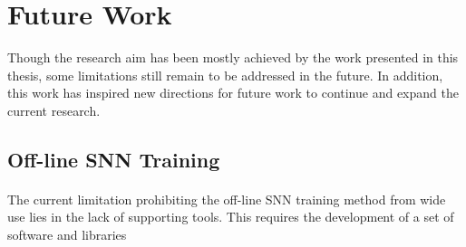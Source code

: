 %



\section{Future Work}
Though the research aim has been mostly achieved by the work presented in this thesis, some limitations still remain to be addressed in the future.
In addition, this work has inspired new directions for future work to continue and expand the current research.

\subsection{Off-line SNN Training}
\DIFdelbegin %

\paragraph{}
\addtocounter{paragraph}{-1}%
\DIFdelend The current limitation prohibiting the off-line SNN training method from wide use lies in the lack of supporting tools.
This requires the development of a set of software and libraries\DIFaddbegin {}


